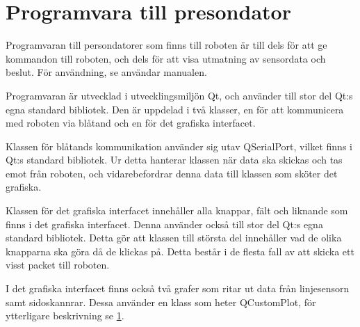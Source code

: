 \section{Programvara till presondator}
Programvaran till persondatorer som finns till roboten är till dels för att ge kommandon till roboten, och dels för att visa utmatning av sensordata och beslut. För användning, se användar manualen.

Programvaran är utvecklad i utvecklingsmiljön Qt, och använder till stor del Qt:s egna standard bibliotek. Den är uppdelad i två klasser, en för att kommunicera med roboten via blåtand och en för det grafiska interfacet.

Klassen för blåtands kommunikation använder sig utav QSerialPort, vilket finns i Qt:s standard bibliotek. Ur detta hanterar klassen när data ska skickas och tas emot från roboten, och vidarebefordrar denna data till klassen som sköter det grafiska.

Klassen för det grafiska interfacet innehåller alla knappar, fält och liknande som finns i det grafiska interfacet. Denna använder också till stor del Qt:s egna standard bibliotek. Detta gör att klassen till största del innehåller vad de olika knapparna ska göra då de klickas på. Detta består i de flesta fall av att skicka ett visst packet till roboten.

I det grafiska interfacet finns också två grafer som ritar ut data från linjesensorn samt sidoskannrar. Dessa använder en klass som heter QCustomPlot, för ytterligare beskrivning se \ref{}.  